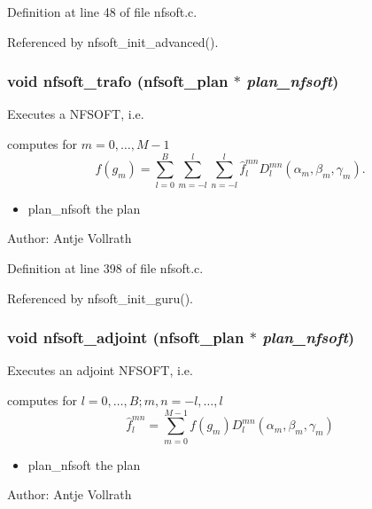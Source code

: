 Definition at line 48 of file nfsoft.c.

Referenced by nfsoft\_\-init\_\-advanced().\hypertarget{group__nfsoft_ge243cd75d7571a99eae53818e32355fb}{
\subsubsection{\setlength{\rightskip}{0pt plus 5cm}void nfsoft\_\-trafo ({\bf nfsoft\_\-plan} $\ast$ {\em plan\_\-nfsoft})}}
\label{group__nfsoft_ge243cd75d7571a99eae53818e32355fb}


Executes a NFSOFT, i.e. 

computes for $m = 0,\ldots,M-1$ \[ f(g_m) = \sum_{l=0}^B \sum_{m=-l}^l \sum_{n=-l}^l \hat{f}^{mn}_l D_l^{mn}\left( \alpha_m,\beta_m,\gamma_m\right). \]

\begin{itemize}
\item plan\_\-nfsoft the plan\end{itemize}
\begin{Desc}
\item[Author:]Antje Vollrath \end{Desc}


Definition at line 398 of file nfsoft.c.

Referenced by nfsoft\_\-init\_\-guru().\hypertarget{group__nfsoft_g08395b1dd90f9a2565685d17460afc5b}{
\subsubsection{\setlength{\rightskip}{0pt plus 5cm}void nfsoft\_\-adjoint ({\bf nfsoft\_\-plan} $\ast$ {\em plan\_\-nfsoft})}}
\label{group__nfsoft_g08395b1dd90f9a2565685d17460afc5b}


Executes an adjoint NFSOFT, i.e. 

computes for $l=0,\ldots,B; m,n=-l,\ldots,l$ \[ \hat{f}^{mn}_l = \sum_{m = 0}^{M-1} f(g_m) D_l^{mn}\left( \alpha_m,\beta_m,\gamma_m\right) \]

\begin{itemize}
\item plan\_\-nfsoft the plan\end{itemize}
\begin{Desc}
\item[Author:]Antje Vollrath \end{Desc}


